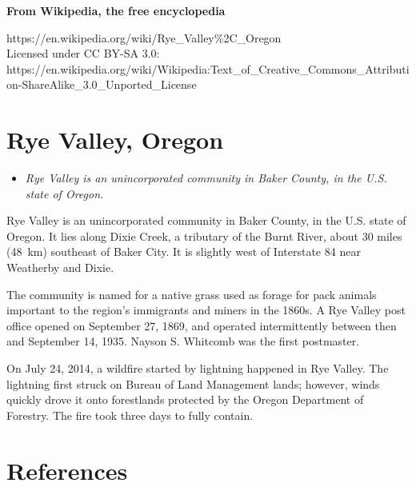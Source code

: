 \textbf{From Wikipedia, the free encyclopedia}

https://en.wikipedia.org/wiki/Rye\_Valley\%2C\_Oregon\\
Licensed under CC BY-SA 3.0:\\
https://en.wikipedia.org/wiki/Wikipedia:Text\_of\_Creative\_Commons\_Attribution-ShareAlike\_3.0\_Unported\_License

\section{Rye Valley, Oregon}\label{rye-valley-oregon}

\begin{itemize}
\item
  \emph{Rye Valley is an unincorporated community in Baker County, in
  the U.S. state of Oregon.}
\end{itemize}

Rye Valley is an unincorporated community in Baker County, in the U.S.
state of Oregon. It lies along Dixie Creek, a tributary of the Burnt
River, about 30 miles (48~km) southeast of Baker City. It is slightly
west of Interstate 84 near Weatherby and Dixie.

The community is named for a native grass used as forage for pack
animals important to the region's immigrants and miners in the 1860s. A
Rye Valley post office opened on September 27, 1869, and operated
intermittently between then and September 14, 1935. Nayson S. Whitcomb
was the first postmaster.

On July 24, 2014, a wildfire started by lightning happened in Rye
Valley. The lightning first struck on Bureau of Land Management lands;
however, winds quickly drove it onto forestlands protected by the Oregon
Department of Forestry. The fire took three days to fully contain.

\section{References}\label{references}
